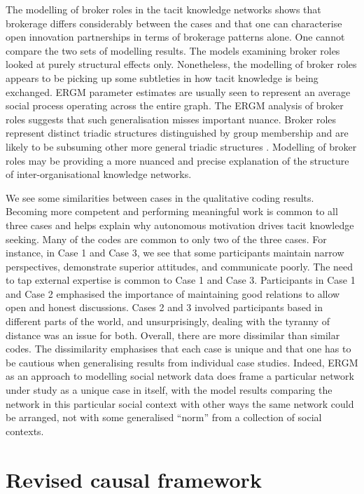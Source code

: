 The modelling of broker roles in the tacit knowledge networks shows that brokerage differs considerably between the cases and that one can characterise open innovation partnerships in terms of brokerage patterns alone. One cannot compare the two sets of modelling results. The models examining broker roles looked at purely structural effects only. Nonetheless, the modelling of broker roles appears to be picking up some subtleties in how tacit knowledge is being exchanged. ERGM parameter estimates are usually seen to represent an average social process operating across the entire graph. The ERGM analysis of broker roles suggests that such generalisation misses important nuance. Broker roles represent distinct triadic structures distinguished by group membership and are likely to be subsuming other more general triadic structures \citep{gould1989structures}. Modelling of broker roles may be providing a more nuanced and precise explanation of the structure of inter-organisational knowledge networks. \medskip

We see some similarities between cases in the qualitative coding results. Becoming more competent and performing meaningful work is common to all three cases and helps explain why autonomous motivation drives tacit knowledge seeking. Many of the codes are common to only two of the three cases. For instance, in Case 1 and Case 3, we see that some participants maintain narrow perspectives, demonstrate superior attitudes, and communicate poorly. The need to tap external expertise is common to Case 1 and Case 3. Participants in Case 1 and Case 2 emphasised the importance of maintaining good relations to allow open and honest discussions. Cases 2 and 3 involved participants based in different parts of the world, and unsurprisingly, dealing with the tyranny of distance was an issue for both. Overall, there are more dissimilar than similar codes. The dissimilarity emphasises that each case is unique and that one has to be cautious when generalising results from individual case studies. Indeed, ERGM as an approach to modelling social network data does frame a particular network under study as a unique case in itself, with the model results comparing the network in this particular social context with other ways the same network could be arranged, not  with some generalised \enquote{norm} from a collection of social contexts. 

\section{Revised causal framework}

